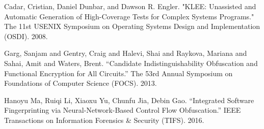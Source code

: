 \documentclass[lnicst]{svmultln}
\begin{document}
\begin{thebibliography}{5}
 Cadar, Cristian, Daniel Dunbar, and Dawson R. Engler. "KLEE: Unassisted and Automatic Generation of High-Coverage Tests for Complex Systems Programs." The 11st USENIX Symposium on Operating Systems Design and Implementation (OSDI). 2008.

 Garg, Sanjam and Gentry, Craig and Halevi, Shai and Raykova, Mariana and Sahai, Amit and Waters, Brent. ``Candidate Indistinguishability Obfuscation and Functional Encryption for All Circuits.'' The 53rd Annual Symposium on Foundations of Computer Science (FOCS). 2013.

 Hanoyu Ma, Ruiqi Li, Xiaoxu Yu, Chunfu Jia, Debin Gao. ``Integrated Software Fingerprinting via Neural-Network-Based Control Flow Obfuscation.'' IEEE Transactions on Information Forensics \& Security (TIFS). 2016.

\end{thebibliography}
%
\end{document}
